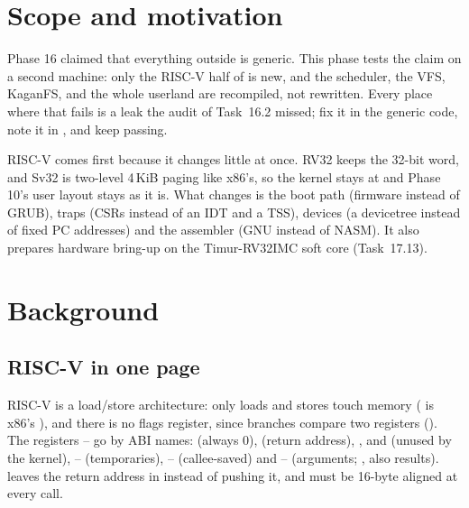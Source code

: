 \documentclass[11pt,a4paper]{article}
\begin{document}


\section{Scope and motivation}

Phase 16 claimed that everything outside  is generic. This phase tests the claim on a second
machine: only the RISC-V half of  is new, and the scheduler, the VFS, KaganFS,  and the
whole userland are recompiled, not rewritten. Every place where that fails is a leak the audit of Task~16.2 missed; fix
it in the generic code, note it in , and keep  passing.

RISC-V comes first because it changes little at once. RV32 keeps the 32-bit word, and Sv32 is two-level 4\,KiB paging
like x86's, so the kernel stays at  and Phase 10's user layout stays as it is. What changes is the boot
path (firmware instead of GRUB), traps (CSRs instead of an IDT and a TSS), devices (a devicetree instead of fixed PC
addresses) and the assembler (GNU  instead of NASM). It also prepares hardware bring-up on the Timur-RV32IMC soft core (Task~17.13).

\section{Background}

\subsection{RISC-V in one page}

RISC-V is a load/store architecture: only loads and stores touch memory ( is x86's
), and there is no flags register, since branches compare two registers ().
The registers -- go by ABI names:  (always 0),  (return address), ,
 and  (unused by the kernel), -- (temporaries), --
(callee-saved) and -- (arguments; ,  also results).  leaves the return
address in  instead of pushing it, and  must be 16-byte aligned at every call.
\end{document}
